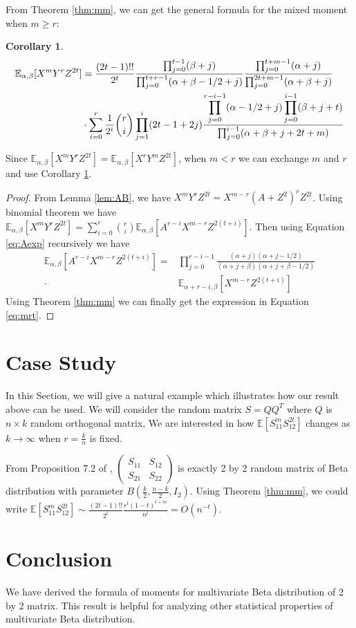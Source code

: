 \documentclass{elsarticle}
\def\E{\mathbb{E}}
\newtheorem{cor}{Corollary}
\begin{document}
From Theorem \ref{thm:mm},
we can get
the general formula for the mixed moment when $m\geq r$:
\begin{cor}\label{cor:mr}
	\begin{align}
	\E_{\alpha, \beta}[X^mY^rZ^{2t}] &= \frac{(2t-1)!!}{2^t}
	\frac{\prod_{j=0}^{t-1} (\beta+j)}{\prod_{j=0}^{t+r-1} (\alpha+\beta-1/2+j)}
	\frac{\prod_{j=0}^{t+m-1}(\alpha+j)}{\prod_{j=0}^{2t+m-1} (\alpha+\beta+j)}\notag\\
	&\cdot\sum_{i=0}^r \frac{1}{2^i}\binom{r}{i}\prod_{j=1}^i (2t-1+2j)
	\frac{\displaystyle\prod_{j=0}^{r-i-1}(\alpha-1/2+j)
		\prod_{j=0}^{i-1}(\beta+j+t)}{\prod_{j=0}^{i-1}(\alpha+\beta+j+2t+m)}
	\label{eq:mrt}
	\end{align}
\end{cor}
Since $\E_{\alpha, \beta}[X^mY^rZ^{2t}]=\E_{\alpha, \beta}[X^rY^mZ^{2t}]$, 
when $m<r$ we can exchange $m$ and $r$ and use Corollary \ref{cor:mr}.
\begin{proof}
	From Lemma \ref{lem:AB}, we have
	$X^m Y^r Z^{2t} = X^{m-r}(A+Z^2)^r Z^{2t} $.
	Using binomial theorem we have
	$\E_{\alpha, \beta}[X^m Y^r Z^{2t}] = \sum_{i=0}^r \binom{r}{i}\E_{\alpha, \beta}
	[A^{r-i}X^{m-r}Z^{2(t+i)}]$. Then using Equation \eqref{eq:Aexp} recursively
	we have 
	\begin{align*}
	\E_{\alpha, \beta}
	[A^{r-i}X^{m-r}Z^{2(t+i)}] =&
	\prod_{j=0}^{r-i-1}\frac{(\alpha+j)(\alpha+j-1/2)}
	{(\alpha+j+\beta)(\alpha+j+\beta-1/2)} \\
	\cdot & \E_{\alpha+r-i, \beta}
	[X^{m-r}Z^{2(t+i)}]
	\end{align*}
	Using Theorem \ref{thm:mm} we can finally get the expression in
	Equation \eqref{eq:mrt}.
\end{proof}
\section{Case Study}
In this Section, we will give a natural example which illustrates how our result above can be used.
We will consider the random matrix $S=QQ^T$ where $Q$ is $n\times k$ random orthogonal matrix,
We are interested in how $\E[S_{11}^mS_{12}^{2t}]$ changes as $k\to \infty$ when $r=\frac{k}{n}$ is fixed.

From Proposition 7.2 of \cite{eaton1989group},
$
\begin{pmatrix}
S_{11} & S_{12} \\
S_{21} & S_{22}
\end{pmatrix}
$
is exactly 2 by 2 random matrix of Beta distribution with parameter $B(\frac{k}{2}, \frac{n-k}{2}, I_2)$.
Using Theorem \ref{thm:mm}, we could write
$\E[S_{11}^mS_{12}^{2t}] \sim \frac{(2t-1)!!}{2^t} \frac{r^t(1-t)^{t+m}}{n^t} = O(n^{-t})$.

\section{Conclusion}
We have derived the formula of moments for multivariate Beta distribution
of 2 by 2 matrix. This result is helpful for analyzing other statistical properties of multivariate Beta distribution.


\end{document}
